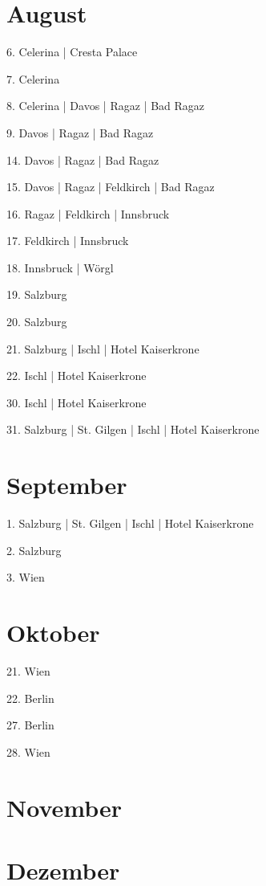 \documentclass[twoside=false,titlepage=false,open=any, parskip=never, fontsize=10pt, headings=small, chapterprefix=false, appendixprefix=false, DIV=15]{scrbook}
\begin{document}
\begin{multicols}{3}
            \section*{August}
            6. Celerina | Cresta Palace\par
            7. Celerina\par
            8. Celerina | Davos | Ragaz | Bad Ragaz\par
            9. Davos | Ragaz | Bad Ragaz\par
            14. Davos | Ragaz | Bad Ragaz\par
            15. Davos | Ragaz | Feldkirch | Bad Ragaz\par
            16. Ragaz | Feldkirch | Innsbruck\par
            17. Feldkirch | Innsbruck\par
            18. Innsbruck | Wörgl\par
            19. Salzburg\par
            20. Salzburg\par
            21. Salzburg | Ischl | Hotel Kaiserkrone\par
            22. Ischl | Hotel Kaiserkrone\par
            30. Ischl | Hotel Kaiserkrone\par
            31. Salzburg | St. Gilgen | Ischl | Hotel Kaiserkrone\par
            \section*{September}
            1. Salzburg | St. Gilgen | Ischl | Hotel Kaiserkrone\par
            2. Salzburg\par
            3. Wien\par
            \section*{Oktober}
            21. Wien\par
            22. Berlin\par
            27. Berlin\par
            28. Wien\par
            \section*{November}
            \section*{Dezember}

\end{multicols}
\end{document}
